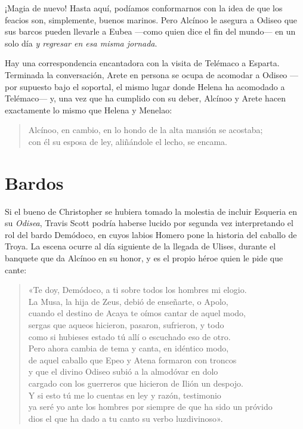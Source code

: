 \documentclass[11pt,a4paper]{article}
\begin{document}
¡Magia de nuevo! Hasta aquí, podíamos conformarnos con la idea de que los feacios son, simplemente, buenos marinos. Pero Alcínoo le asegura a Odiseo que sus barcos pueden llevarle a Eubea ---como quien dice el fin del mundo--- en un solo día \emph{y regresar en esa misma jornada}.

Hay una correspondencia encantadora con la visita de Telémaco a Esparta. Terminada la conversación, Arete en persona se ocupa de acomodar a Odiseo ---por supuesto bajo el soportal, el mismo lugar donde Helena ha acomodado a Telémaco--- y, una vez que ha cumplido con su deber, Alcínoo y Arete hacen exactamente lo mismo que Helena y Menelao:

\begin{verse}
Alcínoo, en cambio, en lo hondo de la alta mansión se acostaba;\\
con él su esposa de ley, aliñándole el lecho, se encama.
\end{verse}


\section*{Bardos}

Si el bueno de Christopher se hubiera tomado la molestia de incluir Esqueria en su \emph{Odisea}, Travis Scott podría haberse lucido por segunda vez interpretando el rol del bardo Demódoco, en cuyos labios Homero pone la historia del caballo de Troya. La escena ocurre al día siguiente de la llegada de Ulises, durante el banquete que da Alcínoo en su honor, y es el propio héroe quien le pide que cante:

\begin{verse}
«Te doy, Demódoco, a ti sobre todos los hombres mi elogio.\\
La Musa, la hija de Zeus, debió de enseñarte, o Apolo,\\
cuando el destino de Acaya te oímos cantar de aquel modo,\\
sergas que aqueos hicieron, pasaron, sufrieron, y todo\\
como si hubieses estado tú allí o escuchado eso de otro.\\
Pero ahora cambia de tema y canta, en idéntico modo,\\
de aquel caballo que Epeo y Atena formaron con troncos\\
y que el divino Odiseo subió a la almodóvar en dolo\\
cargado con los guerreros que hicieron de Ilión un despojo.\\
Y si esto tú me lo cuentas en ley y razón, testimonio\\
ya seré yo ante los hombres por siempre de que ha sido un próvido\\
dios el que ha dado a tu canto su verbo luzdivinoso».
\end{verse}
\end{document}
